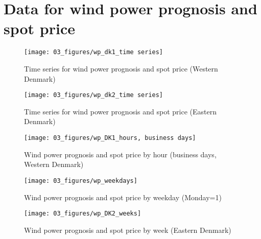 \section{Data for wind power prognosis and spot price}
\label{app:data}

\begin{figure}[H]
  \centering
  \caption{Time series for wind power prognosis and spot price (Western Denmark)}
  \label{fig:wp_dk1_time_series}
    \texttt{[image: 03\_figures/wp\_dk1\_time series]}
\end{figure}

\begin{figure}[H]
  \centering
  \caption{Time series for wind power prognosis and spot price (Eastern Denmark)}
  \label{fig:wp_dk2_time_series}
    \texttt{[image: 03\_figures/wp\_dk2\_time series]}
\end{figure}

\begin{figure}[H]
  \centering
  \caption{Wind power prognosis and spot price by hour (business days, Western Denmark)}
  \label{fig:wp_dk1_hours}
    \texttt{[image: 03\_figures/wp\_DK1\_hours, business days]}
\end{figure}

\begin{figure}[H]
  \centering
  \caption{Wind power prognosis and spot price by weekday (Monday=1)}
  \label{fig:wp_price_weekday}
    \texttt{[image: 03\_figures/wp\_weekdays]}
\end{figure}

\begin{figure}[H]
  \centering
  \caption{Wind power prognosis and spot price by week (Eastern Denmark)}
  \label{fig:wp_price_dk2_week}
    \texttt{[image: 03\_figures/wp\_DK2\_weeks]}
\end{figure}

